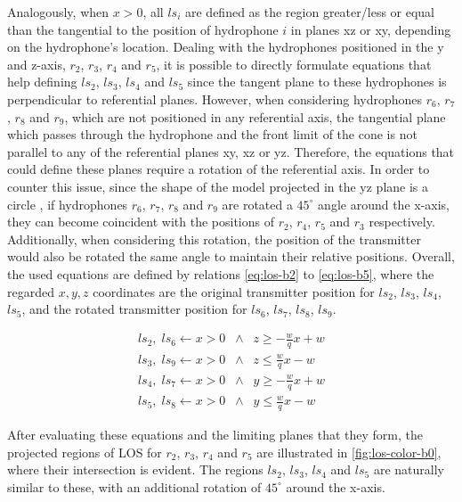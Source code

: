 Analogously, when $x > 0$, all $ls_i$ are defined as the region greater/less or equal than the tangential to the position of hydrophone $i$ in planes xz or xy, depending on the hydrophone's location. Dealing with the hydrophones positioned in the y and z-axis, $r_2$, $r_3$, $r_4$ and $r_5$, it is possible to directly formulate equations that help defining $ls_2$, $ls_3$, $ls_4$ and $ls_5$ since the tangent plane to these hydrophones is perpendicular to referential planes. However, when considering hydrophones $r_6$, $r_7$, $r_8$ and $r_9$, which are not positioned in any referential axis, the tangential plane which passes through the hydrophone and the front limit of the cone is not parallel to any of the referential planes xy, xz or yz. Therefore, the equations that could define these planes require a rotation of the referential axis. In order to counter this issue, since the shape of the model projected in the yz plane is a circle , if hydrophones $r_6$, $r_7$, $r_8$ and $r_9$ are rotated a $45^{\circ}$ angle around the x-axis, they can become coincident with the positions of $r_2$, $r_4$, $r_5$ and $r_3$ respectively. Additionally, when considering this rotation, the position of the transmitter would also be rotated the same angle to maintain their relative positions. Overall, the used equations are defined by relations \ref{eq:los-b2} to \ref{eq:los-b5}, where the regarded $x,y,z$ coordinates are the original transmitter position for $ls_2$, $ls_3$, $ls_4$, $ls_5$, and the rotated transmitter position for $ls_6$, $ls_7$, $ls_8$, $ls_9$.

\begin{eqnarray}
ls_2, \;  ls_6  \gets x > 0 \; \;  \wedge  \; \; z \geq -\frac{w}{q} x + w  
\label{eq:los-b2} \\
ls_3, \;  ls_9 \gets x > 0 \; \;  \wedge  \; \; z \leq \frac{w}{q} x - w  
\label{eq:los-b3} \\
ls_4, \;  ls_7 \gets x > 0 \; \;  \wedge  \; \; y \geq -\frac{w}{q} x + w 
\label{eq:los-b4} \\
ls_5, \;  ls_8 \gets x > 0 \; \;  \wedge  \; \; y \leq \frac{w}{q} x - w  
\label{eq:los-b5}
\end{eqnarray}

After evaluating these equations and the limiting planes that they form, the projected regions of LOS for $r_2$, $r_3$, $r_4$ and $r_5$ are illustrated in \ref{fig:los-color-b0}, where their intersection is evident. The regions $ls_2$, $ls_3$, $ls_4$ and $ls_5$ are naturally similar to these, with an additional rotation of $45^{\circ}$ around the x-axis.

